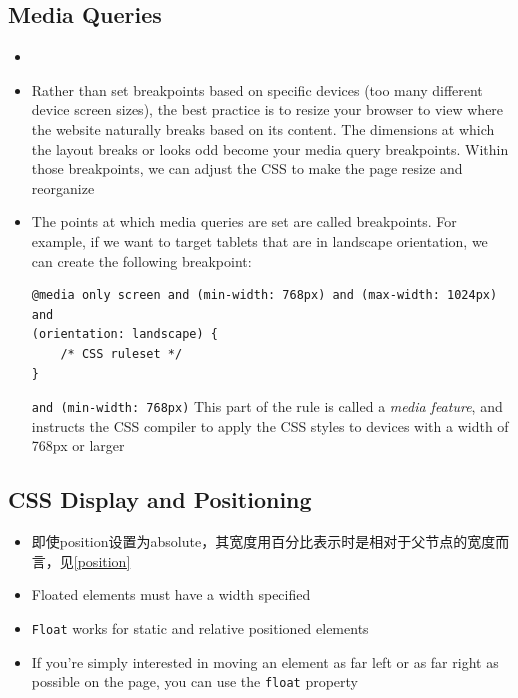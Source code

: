 \documentclass[a4paper, 12pt]{article}
\begin{document}
\subsection{Media Queries}
\begin{itemize}
\item 

\item Rather than set breakpoints based on specific devices (too many different device screen sizes), the best practice is to resize your browser to view where the website naturally breaks based on its content. The dimensions at which the layout breaks or looks odd become your media query breakpoints. Within those breakpoints, we can adjust the CSS to make the page resize and reorganize

\item The points at which media queries are set are called breakpoints. For example, if we want to target tablets that are in landscape orientation, we can create the following breakpoint:
\begin{verbatim}
@media only screen and (min-width: 768px) and (max-width: 1024px) and 
(orientation: landscape) {
    /* CSS ruleset */
}
\end{verbatim}
\verb|and (min-width: 768px)| \textemdash This part of the rule is called a \textit{media feature}, and instructs the CSS compiler to apply the CSS styles to devices with a width of 768px or larger

\end{itemize}

\subsection{CSS Display and Positioning}
\begin{itemize}
\item 即使position设置为absolute，其宽度用百分比表示时是相对于父节点的宽度而言，见\ref{position}

\item Floated elements must have a width specified

\item \verb|Float| works for static and relative positioned elements

\item  If you're simply interested in moving an element as far left or as far right as possible on the page, you can use the \verb|float| property

\end{itemize}
\end{document}
